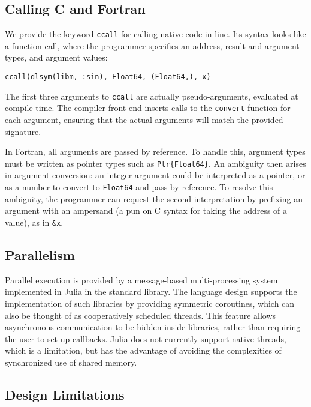 \documentclass[9pt]{sigplanconf}
\begin{document}
\subsection{Calling C and Fortran}

We provide the keyword {\tt ccall} for calling native code in-line.
Its syntax looks like a function call, where the programmer specifies
an address, result and argument types, and argument values:

\begin{verbatim}
ccall(dlsym(libm, :sin), Float64, (Float64,), x)
\end{verbatim}

The first three arguments to {\tt ccall} are actually pseudo-arguments,
evaluated at compile time. The compiler front-end inserts calls to the
{\tt convert} function for each argument, ensuring that the actual arguments
will match the provided signature.

In Fortran, all arguments are passed by reference. To handle this,
argument types must be written as pointer types such as
{\tt Ptr\{Float64\}}. An ambiguity then arises in argument conversion:
an integer argument could be interpreted as a pointer, or as a number
to convert to {\tt Float64} and pass by reference. To resolve this
ambiguity, the programmer can request the second interpretation by
prefixing an argument with an ampersand (a pun on C syntax for taking the
address of a value), as in {\tt \&x}.

\subsection{Parallelism}

Parallel execution is provided by a message-based multi-processing
system implemented in Julia in the standard library.
The language design supports the implementation of such libraries by
providing symmetric coroutines, which can also be thought of as
cooperatively scheduled threads. This feature allows asynchronous
communication to be hidden inside libraries, rather than requiring the
user to set up callbacks. Julia does not currently support
native threads, which is a limitation, but has the advantage of avoiding
the complexities of synchronized use of shared memory.

\subsection{Design Limitations}
\end{document}
